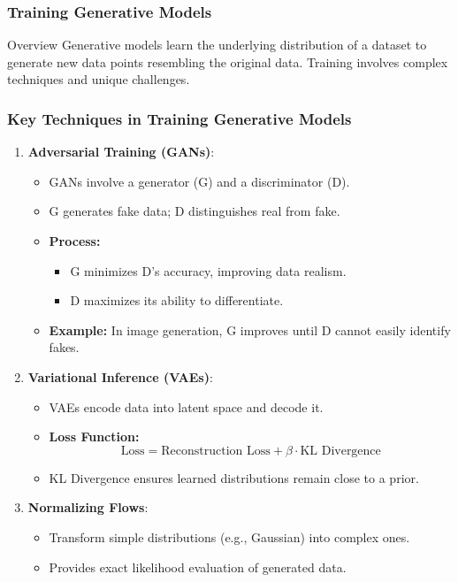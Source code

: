 \documentclass[aspectratio=169]{beamer}
\begin{document}
\begin{frame}[fragile]
    \frametitle{Training Generative Models}
    \begin{block}{Overview}
        Generative models learn the underlying distribution of a dataset to generate new data points resembling the original data. Training involves complex techniques and unique challenges.
    \end{block}
\end{frame}

\begin{frame}[fragile]
    \frametitle{Key Techniques in Training Generative Models}
    \begin{enumerate}
        \item \textbf{Adversarial Training (GANs)}:
            \begin{itemize}
                \item GANs involve a generator (G) and a discriminator (D).
                \item G generates fake data; D distinguishes real from fake.
                \item \textbf{Process:}
                    \begin{itemize}
                        \item G minimizes D's accuracy, improving data realism.
                        \item D maximizes its ability to differentiate.
                    \end{itemize}
                \item \textbf{Example:} In image generation, G improves until D cannot easily identify fakes.
            \end{itemize}
        
        \item \textbf{Variational Inference (VAEs)}:
            \begin{itemize}
                \item VAEs encode data into latent space and decode it.
                \item \textbf{Loss Function:}
                \begin{equation}
                    \text{Loss} = \text{Reconstruction Loss} + \beta \cdot \text{KL Divergence}
                \end{equation}
                \item KL Divergence ensures learned distributions remain close to a prior.
            \end{itemize}
        
        \item \textbf{Normalizing Flows}:
            \begin{itemize}
                \item Transform simple distributions (e.g., Gaussian) into complex ones.
                \item Provides exact likelihood evaluation of generated data.
            \end{itemize}
    \end{enumerate}
\end{frame}
\end{document}
